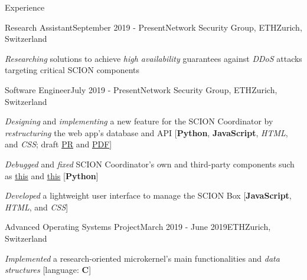 \documentclass{resume}
\begin{document}
\begin{rSection}{Experience}

\begin{rSubsection}{Research Assistant}{September 2019 - Present}{Network Security Group, ETH}{Zurich, Switzerland}
\item \textit{Researching} solutions to achieve \textit{high availability} guarantees against \textit{DDoS} attacks targeting critical SCION components
\end{rSubsection}

\begin{rSubsection}{Software Engineer}{July 2019 - Present}{Network Security Group, ETH}{Zurich, Switzerland}
\item \textit{Designing} and \textit{implementing} a new feature for the SCION Coordinator by \textit{restructuring} the web app's database and API [\textbf{Python}, \textbf{JavaScript}, \textit{HTML}, and \textit{CSS}; draft \href{https://github.com/netsec-ethz/scionlab/pull/195}{PR} and \href{https://github.com/andreatulimiero/scionlab-multiap-proposal/blob/master/proposal.pdf}{PDF}]
\item \textit{Debugged} and \textit{fixed} SCION Coordinator's own and third-party components such as \href{https://github.com/netsec-ethz/scionlab/pull/197}{this} and \href{https://github.com/django-crispy-forms/django-crispy-forms/pull/942}{this} [\textbf{Python}]
\item \textit{Developed} a lightweight user interface to manage the SCION Box [\textbf{JavaScript}, \textit{HTML}, and \textit{CSS}]
\end{rSubsection}


\begin{rSubsection}{Advanced Operating Systems Project}{March 2019 - June 2019}{ETH}{Zurich, Switzerland}
\item \textit{Implemented} a research-oriented microkernel's main functionalities and \textit{data structures} [language: \textbf{C}]
\end{rSubsection}

\end{rSection}

\end{document}
